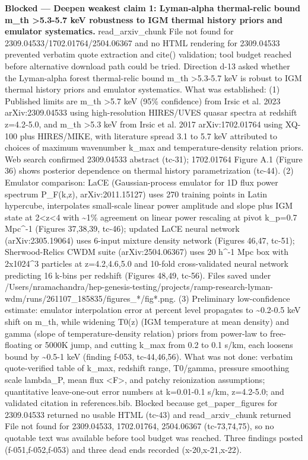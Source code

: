 \documentclass[11pt,a4paper]{article}
\begin{document}
\textbf{Blocked --- Deepen weakest claim 1: Lyman-alpha thermal-relic bound m\_th \textgreater{}5.3-5.7 keV robustness to IGM thermal history priors and emulator systematics.} read\_arxiv\_chunk File not found for 2309.04533/1702.01764/2504.06367 and no HTML rendering for 2309.04533 prevented verbatim quote extraction and cite() validation; tool budget reached before alternative download path could be tried. Direction d-13 asked whether the Lyman-alpha forest thermal-relic bound m\_th \textgreater{}5.3-5.7 keV is robust to IGM thermal history priors and emulator systematics. What was established: (1) Published limits are m\_th \textgreater{}5.7 keV (95\% confidence) from Irsic et al. 2023 arXiv:2309.04533 using high-resolution HIRES/UVES quasar spectra at redshift z=4.2-5.0, and m\_th \textgreater{}5.3 keV from Irsic et al. 2017 arXiv:1702.01764 using XQ-100 plus HIRES/MIKE, with literature spread 3.1 to 5.7 keV attributed to choices of maximum wavenumber k\_max and temperature-density relation priors. Web search confirmed 2309.04533 abstract (tc-31); 1702.01764 Figure A.1 (Figure 36) shows posterior dependence on thermal history parametrization (tc-44). (2) Emulator comparison: LaCE (Gaussian-process emulator for 1D flux power spectrum P\_F(k,z), arXiv:2011.15127) uses 270 training points in Latin hypercube, interpolates small-scale linear power amplitude and slope plus IGM state at 2\textless{}z\textless{}4 with \textasciitilde{}1\% agreement on linear power rescaling at pivot k\_p=0.7 Mpc\textasciicircum{}-1 (Figures 37,38,39, tc-46); updated LaCE neural network (arXiv:2305.19064) uses 6-input mixture density network (Figures 46,47, tc-51); Sherwood-Relics CWDM suite (arXiv:2504.06367) uses 20 h\textasciicircum{}-1 Mpc box with 2x1024\textasciicircum{}3 particles at z=4.2,4.6,5.0 and 10-fold cross-validated neural network predicting 16 k-bins per redshift (Figures 48,49, tc-56). Files saved under /Users/nramachandra/hep-genesis-testing/projects/ramp-research-lyman-wdm/runs/261107\_185835/figures\_*/fig*.png. (3) Preliminary low-confidence estimate: emulator interpolation error at percent level propagates to \textasciitilde{}0.2-0.5 keV shift on m\_th, while widening T0(z) (IGM temperature at mean density) and gamma (slope of temperature-density relation) priors from power-law to free-floating or 5000K jump, and cutting k\_max from 0.2 to 0.1 s/km, each loosens bound by \textasciitilde{}0.5-1 keV (finding f-053, tc-44,46,56). What was not done: verbatim quote-verified table of k\_max, redshift range, T0/gamma, pressure smoothing scale lambda\_P, mean flux \textless{}F\textgreater{}, and patchy reionization assumptions; quantitative leave-one-out error numbers at k=0.01-0.1 s/km, z=4.2-5.0; and validated citation in references.bib. Blocked because get\_paper\_figures for 2309.04533 returned no usable HTML (tc-43) and read\_arxiv\_chunk returned File not found for 2309.04533, 1702.01764, 2504.06367 (tc-73,74,75), so no quotable text was available before tool budget was reached. Three findings posted (f-051,f-052,f-053) and three dead ends recorded (x-20,x-21,x-22).
\end{document}
